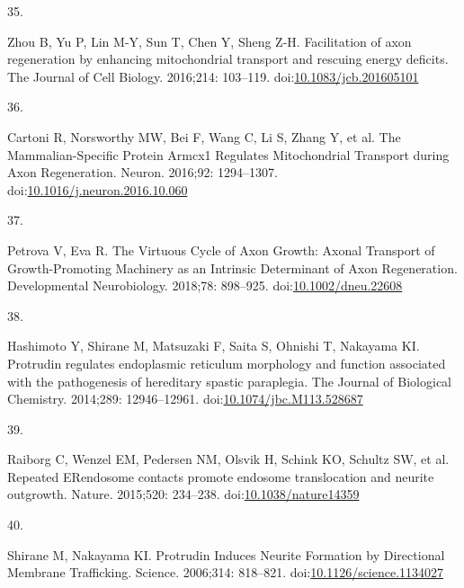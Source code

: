 \documentclass[
  12pt,
  a4paper,
]{book}
\newlength{\cslhangindent}
\newlength{\csllabelwidth}
\newlength{\cslentryspacingunit} %
\newenvironment{CSLReferences}[2] %
 {%
  \setlength{\parindent}{0pt}
  \ifodd #1
  \let\oldpar\par
  \def\par{\hangindent=\cslhangindent\oldpar}
  \fi
  \setlength{\parskip}{#2\cslentryspacingunit}
 }%
 {}
\newcommand{\CSLLeftMargin}[1]{\parbox[t]{\csllabelwidth}{#1}}
\newcommand{\CSLRightInline}[1]{\parbox[t]{\linewidth - \csllabelwidth}{#1}\break}
\begin{document}
\begin{CSLReferences}{0}{0}
\leavevmode{}%
\CSLLeftMargin{35. }%
\CSLRightInline{Zhou B, Yu P, Lin M-Y, Sun T, Chen Y, Sheng Z-H. Facilitation of axon regeneration by enhancing mitochondrial transport and rescuing energy deficits. The Journal of Cell Biology. 2016;214: 103--119. doi:\href{https://doi.org/10.1083/jcb.201605101}{10.1083/jcb.201605101}}

\leavevmode{}%
\CSLLeftMargin{36. }%
\CSLRightInline{Cartoni R, Norsworthy MW, Bei F, Wang C, Li S, Zhang Y, et al. The {Mammalian-Specific Protein Armcx1 Regulates Mitochondrial Transport} during {Axon Regeneration}. Neuron. 2016;92: 1294--1307. doi:\href{https://doi.org/10.1016/j.neuron.2016.10.060}{10.1016/j.neuron.2016.10.060}}

\leavevmode{}%
\CSLLeftMargin{37. }%
\CSLRightInline{Petrova V, Eva R. The {Virtuous Cycle} of {Axon Growth}: {Axonal Transport} of {Growth-Promoting Machinery} as an {Intrinsic Determinant} of {Axon Regeneration}. Developmental Neurobiology. 2018;78: 898--925. doi:\href{https://doi.org/10.1002/dneu.22608}{10.1002/dneu.22608}}

\leavevmode{}%
\CSLLeftMargin{38. }%
\CSLRightInline{Hashimoto Y, Shirane M, Matsuzaki F, Saita S, Ohnishi T, Nakayama KI. Protrudin regulates endoplasmic reticulum morphology and function associated with the pathogenesis of hereditary spastic paraplegia. The Journal of Biological Chemistry. 2014;289: 12946--12961. doi:\href{https://doi.org/10.1074/jbc.M113.528687}{10.1074/jbc.M113.528687}}

\leavevmode{}%
\CSLLeftMargin{39. }%
\CSLRightInline{Raiborg C, Wenzel EM, Pedersen NM, Olsvik H, Schink KO, Schultz SW, et al. Repeated {ER}\textendash endosome contacts promote endosome translocation and neurite outgrowth. Nature. 2015;520: 234--238. doi:\href{https://doi.org/10.1038/nature14359}{10.1038/nature14359}}

\leavevmode{}%
\CSLLeftMargin{40. }%
\CSLRightInline{Shirane M, Nakayama KI. Protrudin {Induces Neurite Formation} by {Directional Membrane Trafficking}. Science. 2006;314: 818--821. doi:\href{https://doi.org/10.1126/science.1134027}{10.1126/science.1134027}}


\end{CSLReferences}
\end{document}
